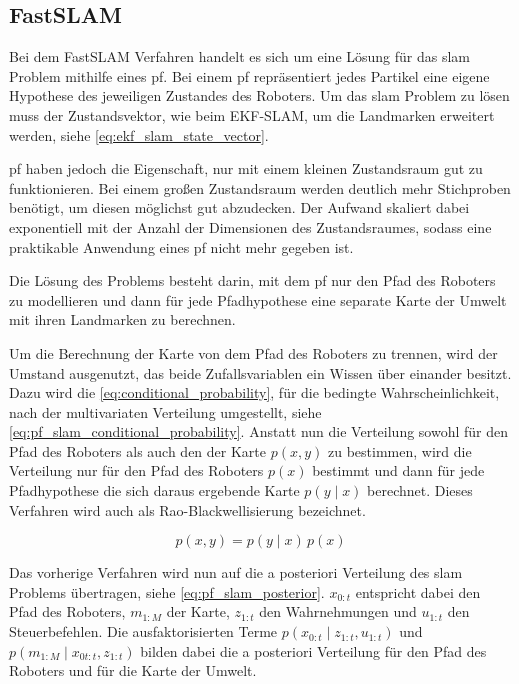 \subsection{FastSLAM}

Bei dem FastSLAM Verfahren handelt es sich um eine Lösung für das \gls{slam} Problem mithilfe eines \gls{pf}. Bei einem \gls{pf} repräsentiert jedes Partikel eine eigene Hypothese  des jeweiligen Zustandes des Roboters. Um das \gls{slam} Problem zu lösen muss der Zustandsvektor, wie beim EKF-SLAM, um die Landmarken erweitert werden, siehe \autoref{eq:ekf_slam_state_vector}.

\gls{pf} haben jedoch die Eigenschaft, nur mit einem kleinen Zustandsraum gut zu funktionieren. Bei einem großen Zustandsraum werden deutlich mehr Stichproben benötigt, um diesen möglichst gut abzudecken. Der Aufwand skaliert dabei exponentiell mit der Anzahl der Dimensionen des Zustandsraumes, sodass eine praktikable Anwendung eines \gls{pf} nicht mehr gegeben ist.

Die Lösung des Problems besteht darin, mit dem \gls{pf} nur den Pfad des Roboters zu modellieren und dann für jede Pfadhypothese eine separate Karte der Umwelt mit ihren Landmarken zu berechnen.

Um die Berechnung der Karte von dem Pfad des Roboters zu trennen, wird der Umstand ausgenutzt, das beide Zufallsvariablen ein Wissen über einander besitzt. Dazu wird die \autoref{eq:conditional_probability}, für die bedingte Wahrscheinlichkeit, nach der multivariaten Verteilung umgestellt, siehe \autoref{eq:pf_slam_conditional_probability}. Anstatt nun die Verteilung sowohl für den Pfad des Roboters als auch den der Karte $p(x, y)$ zu bestimmen, wird die Verteilung nur für den Pfad des Roboters $p(x)$ bestimmt und dann für jede Pfadhypothese die sich daraus ergebende Karte \mbox{$p(y \mid x)$} berechnet. Dieses Verfahren wird auch als Rao-Blackwellisierung bezeichnet.

\begin{equation}
p(x, y) = p(y \mid x) \, p(x) \label{eq:pf_slam_conditional_probability}
\end{equation}

Das vorherige Verfahren wird nun auf die a posteriori Verteilung des \gls{slam} Problems übertragen, siehe \autoref{eq:pf_slam_posterior}. $x_{0:t}$ entspricht dabei den Pfad des Roboters, $m_{1:M}$ der Karte, $z_{1:t}$ den Wahrnehmungen und $u_{1:t}$ den Steuerbefehlen. Die ausfaktorisierten Terme $p(x_{0:t} \mid z_{1:t}, u_{1:t})$ und $p(m_{1:M} \mid x_{0t:t}, z_{1:t})$ bilden dabei die a posteriori Verteilung für den Pfad des Roboters und für die Karte der Umwelt.

